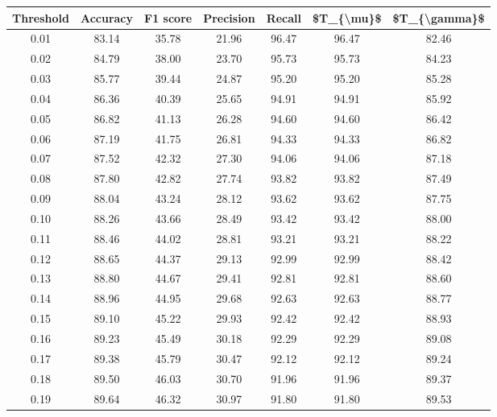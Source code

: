 \begin{tabular}{|c|c|c|c|c|c|c|}
\hline
 Threshold &  Accuracy &  F1 score &  Precision &  Recall &  \$T\_\{\textbackslash mu\}\$ &  \$T\_\{\textbackslash gamma\}\$ \\
\hline
      0.01 &     83.14 &     35.78 &      21.96 &   96.47 &      96.47 &         82.46 \\
      0.02 &     84.79 &     38.00 &      23.70 &   95.73 &      95.73 &         84.23 \\
      0.03 &     85.77 &     39.44 &      24.87 &   95.20 &      95.20 &         85.28 \\
      0.04 &     86.36 &     40.39 &      25.65 &   94.91 &      94.91 &         85.92 \\
      0.05 &     86.82 &     41.13 &      26.28 &   94.60 &      94.60 &         86.42 \\
      0.06 &     87.19 &     41.75 &      26.81 &   94.33 &      94.33 &         86.82 \\
      0.07 &     87.52 &     42.32 &      27.30 &   94.06 &      94.06 &         87.18 \\
      0.08 &     87.80 &     42.82 &      27.74 &   93.82 &      93.82 &         87.49 \\
      0.09 &     88.04 &     43.24 &      28.12 &   93.62 &      93.62 &         87.75 \\
      0.10 &     88.26 &     43.66 &      28.49 &   93.42 &      93.42 &         88.00 \\
      0.11 &     88.46 &     44.02 &      28.81 &   93.21 &      93.21 &         88.22 \\
      0.12 &     88.65 &     44.37 &      29.13 &   92.99 &      92.99 &         88.42 \\
      0.13 &     88.80 &     44.67 &      29.41 &   92.81 &      92.81 &         88.60 \\
      0.14 &     88.96 &     44.95 &      29.68 &   92.63 &      92.63 &         88.77 \\
      0.15 &     89.10 &     45.22 &      29.93 &   92.42 &      92.42 &         88.93 \\
      0.16 &     89.23 &     45.49 &      30.18 &   92.29 &      92.29 &         89.08 \\
      0.17 &     89.38 &     45.79 &      30.47 &   92.12 &      92.12 &         89.24 \\
      0.18 &     89.50 &     46.03 &      30.70 &   91.96 &      91.96 &         89.37 \\
      0.19 &     89.64 &     46.32 &      30.97 &   91.80 &      91.80 &         89.53 \\

\end{tabular}
